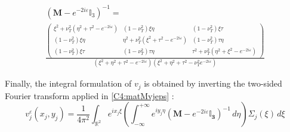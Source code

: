 \begin{multline}
(\mathbf{M}-e^{-2i\varepsilon}\mathbb{I}_3)^{-1}=\\
\frac{\begin{pmatrix}
\xi^2+\nu_T^2(\eta^2+\tau^2-e^{-2i\varepsilon}) & (1-\nu_T^2)\xi \eta & (1-\nu_T^2)\xi \tau \\
(1-\nu_T^2)\xi \eta & \eta^2+\nu_T^2(\xi^2+\tau^2-e^{-2i\varepsilon}) & (1-\nu_T^2)\tau \eta \\
(1-\nu_T^2)\xi \tau & (1-\nu_T^2)\tau \eta & \tau^2+\nu_T^2(\eta^2+\xi^2-e^{-2i\varepsilon})
\end{pmatrix}}{(\xi^2+\eta^2+\tau^2-e^{-2i\varepsilon})(\xi^2+\eta^2+\tau^2-\nu_T^2e^{-2i\varepsilon})} 
\end{multline}

Finally, the integral formulation of $v_j$ is obtained by inverting the two-sided Fourier transform applied in \eqref{C4:matMvjeps} :
\begin{equation}
v_j^{\varepsilon}(x_j,y_j)=\frac{1}{4\pi^2}\int_{\mathbb{R}^2} e^{i x_j\xi}\left( \int_{-\infty}^{+\infty}e^{iy_j\eta} (\mathbf{M}-e^{-2i\varepsilon}\mathbf{\mathbb{I}_3})^{-1} \,d\eta \right) \Sigma_j(\xi) \,d\xi
 \label{C4:invdouble}
\end{equation}

